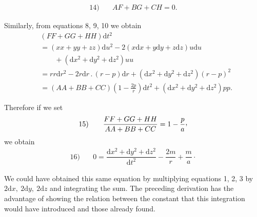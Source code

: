 \[
\begin{array}{rl}14)\quad&AF+BG+CH=0.\end{array}
\]
\par Similarly, from equations 8, 9, 10 we obtain
\[
\begin{aligned}
&(FF+GG+HH)\mathrm{d}t^2\\
&=(xx+yy+zz)\mathrm{d}u^2-2(x\mathrm{d}x+y\mathrm{d}y+z\mathrm{d}z)u\mathrm{d}u\\
&\qquad{}+(\mathrm{d}x^2+\mathrm{d}y^2+\mathrm{d}z^2)uu\\
&=rr\mathrm{d}r^2-2r\mathrm{d}r\mathpunct{.}(r-p)\mathrm{d}r+(\mathrm{d}x^2+\mathrm{d}y^2+\mathrm{d}z^2)(r-p)^2\\
&=(AA+BB+CC)\left(1-\frac{2p}{r}\right)\mathrm{d}t^2+(\mathrm{d}x^2+\mathrm{d}y^2+\mathrm{d}z^2)pp.
\end{aligned}
\]
\par Therefore if we set
\[
\begin{array}{rl}15)\quad&\dfrac{FF+GG+HH}{AA+BB+CC}=1-\dfrac{p}{a}\mathpunct{\raisebox{.45ex}{,}}\end{array}
\]
we obtain
\[
\begin{array}{rl}16)\quad&0=\dfrac{\mathrm{d}x^2+\mathrm{d}y^2+\mathrm{d}z^2}{\mathrm{d}t^2}-\dfrac{2m}{r}+\dfrac{m}{a}\mathpunct{\cdot}\end{array}
\]
\par We could have obtained this same equation by multiplying equations 1, 2, 3 by \(2\mathrm{d}x,\ 2\mathrm{d}y,\ 2\mathrm{d}z\) and integrating the sum. The preceding derivation has the advantage of showing the relation between the constant that this integration would have introduced and those already found.
\par
